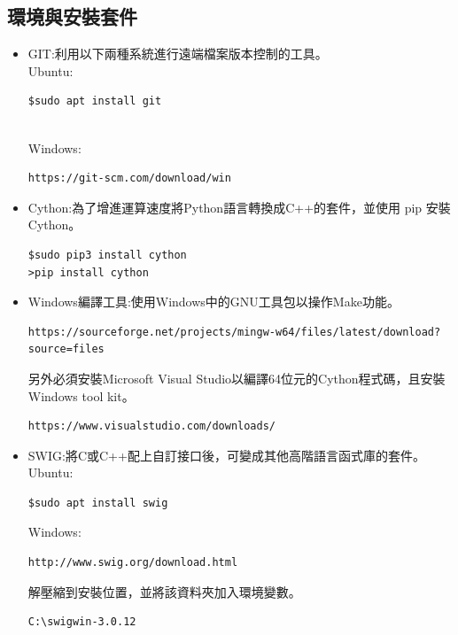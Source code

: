 \documentclass[14pt,a4paper]{report}  %
\begin{document}
\subsection{環境與安裝套件}
		\begin{itemize}
		\item GIT:利用以下兩種系統進行遠端檔案版本控制的工具。
		\hspace*{\fill} \\
		Ubuntu:\\
		\begin{lstlisting}[caption=使用apt安裝Git]
$sudo apt install git
		\end{lstlisting}
		\hspace*{\fill} \\
		Windows:\\
		\begin{lstlisting}[caption=下載新版Git]
https://git-scm.com/download/win
		\end{lstlisting}
		\end{itemize}
     
     \begin{itemize}
		\item Cython:為了增進運算速度將Python語言轉換成C++的套件，並使用 pip 安裝 Cython。\\
		\begin{lstlisting}[caption=安裝 Cython]
$sudo pip3 install cython 
>pip install cython
		\end{lstlisting}
		\end{itemize}
		
	\begin{itemize}
		\item Windows編譯工具:使用Windows中的GNU工具包以操作Make功能。
		\begin{lstlisting}[caption=下載新版MinGW(32Bit）]
https://sourceforge.net/projects/mingw-w64/files/latest/download?source=files
		\end{lstlisting}
		另外必須安裝Microsoft Visual Studio以編譯64位元的Cython程式碼，且安裝Windows tool kit。
		\begin{lstlisting}[caption=安裝各類編譯程式]
https://www.visualstudio.com/downloads/
		\end{lstlisting}
		\end{itemize}
		   
	\begin{itemize}
		\item SWIG:將C或C++配上自訂接口後，可變成其他高階語言函式庫的套件。
		\hspace*{\fill} \\
		Ubuntu:\\
		\begin{lstlisting}[caption=使用apt安裝]
$sudo apt install swig
		\end{lstlisting}
		Windows:\\
		\begin{lstlisting}[caption=下載新版SWIG]
http://www.swig.org/download.html
		\end{lstlisting}
		解壓縮到安裝位置，並將該資料夾加入環境變數。
		\begin{lstlisting}[caption=安裝位置]
C:\swigwin-3.0.12
		\end{lstlisting}
		\end{itemize}
		 
\end{document}
